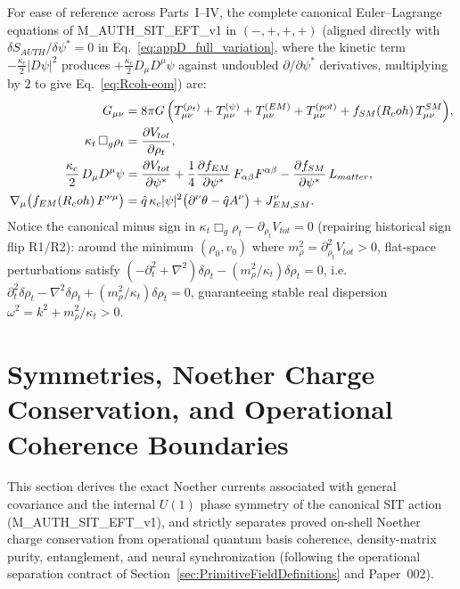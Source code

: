 \documentclass[american,11pt,letterpaper]{article}
\newcommand{\Rcoh}{R_{\mathrm{coh}}}
\def\mathbf#1{#1}%
\def\mathcal#1{#1}%
\def\mathrm#1{#1}%
\def\texttt#1{#1}%
\def\Rcoh{R_coh}%
\begin{document}
For ease of reference across Parts~I--IV, the complete canonical Euler--Lagrange equations of \texttt{M\_AUTH\_SIT\_EFT\_v1} in $(-,+,+,+)$ (aligned directly with $\delta S_{\mathrm{AUTH}}/\delta\psi^* = 0$ in Eq.~\eqref{eq:appD_full_variation}, where the kinetic term $-\frac{\kappa_c}{2}|D\psi|^2$ produces $+\frac{\kappa_c}{2}D_\mu D^\mu\psi$ against undoubled $\partial/\partial\psi^*$ derivatives, multiplying by $2$ to give Eq.~\eqref{eq:Rcoh-eom}) are:
\begin{align}
G_{\mu\nu} &= 8\pi G\,\Bigl(T_{\mu\nu}^{(\rho_t)} + T_{\mu\nu}^{(\psi)} + T_{\mu\nu}^{(\mathrm{EM})} + T_{\mu\nu}^{(\mathrm{pot})} + f_{\mathrm{SM}}(\Rcoh)\,T_{\mu\nu}^{\mathrm{SM}}\Bigr), \label{eq:summary_einstein_sec8}\\
\kappa_t\,\Box_g\rho_t &= \frac{\partial V_{\mathrm{tot}}}{\partial\rho_t}, \label{eq:summary_rhot_sec8}\\
\frac{\kappa_c}{2}\,D_\mu D^\mu\psi &= \frac{\partial V_{\mathrm{tot}}}{\partial\psi^*}
  + \frac{1}{4}\frac{\partial f_{\mathrm{EM}}}{\partial\psi^*}\,F_{\alpha\beta}F^{\alpha\beta}
  - \frac{\partial f_{\mathrm{SM}}}{\partial\psi^*}\,\mathcal{L}_{\mathrm{matter}}, \label{eq:summary_psi_sec8}\\
\nabla_\mu\bigl(f_{\mathrm{EM}}(\Rcoh)\,F^{\nu\mu}\bigr) &= \hat{q}\,\kappa_c|\psi|^2\bigl(\partial^\nu\theta - \hat{q}A^\nu\bigr) + J^\nu_{\mathrm{EM,SM}}. \label{eq:summary_maxwell_sec8}
\end{align}
Notice the canonical minus sign in $\kappa_t\Box_g\rho_t - \partial_{\rho_t}V_{\mathrm{tot}} = 0$ (repairing historical sign flip \texttt{R1}/\texttt{R2}): around the minimum $(\rho_0, v_0)$ where $m_\rho^2 = \partial_{\rho_t}^2 V_{\mathrm{tot}} > 0$, flat-space perturbations satisfy $(-\partial_t^2 + \nabla^2)\delta\rho_t - (m_\rho^2/\kappa_t)\delta\rho_t = 0$, i.e.\ $\partial_t^2\delta\rho_t - \nabla^2\delta\rho_t + (m_\rho^2/\kappa_t)\delta\rho_t = 0$, guaranteeing stable real dispersion $\omega^2 = \mathbf{k}^2 + m_\rho^2/\kappa_t > 0$.
\section{Symmetries, Noether Charge Conservation, and Operational Coherence Boundaries}
\label{sec:coherence-conservation}
\label{sec:symmetry-noether-moved}
\label{app:NoetherCurrents}

This section derives the exact Noether currents associated with general covariance and the internal $U(1)$ phase symmetry of the canonical SIT action (\texttt{M\_AUTH\_SIT\_EFT\_v1}), and strictly separates proved on-shell Noether charge conservation from operational quantum basis coherence, density-matrix purity, entanglement, and neural synchronization (following the operational separation contract of Section~\ref{sec:PrimitiveFieldDefinitions} and Paper~002).
\end{document}
